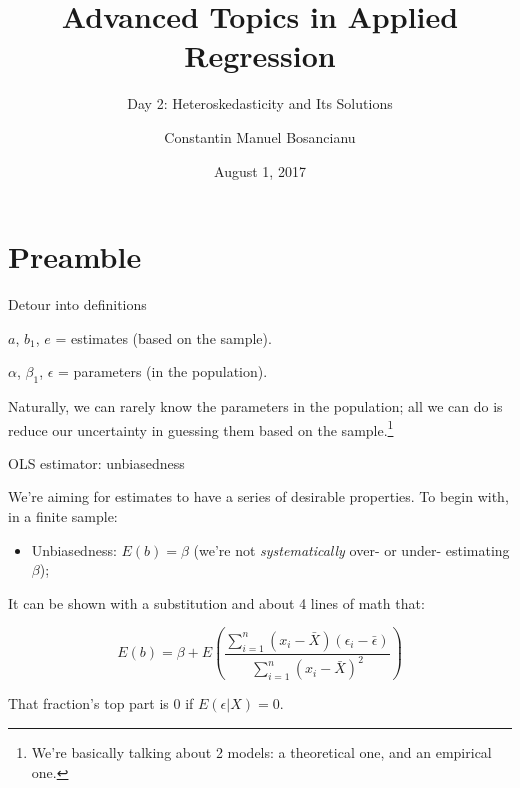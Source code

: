 \documentclass[12pt,english,pdf,xcolor=dvipsnames,aspectratio=169,handout]{beamer}\usepackage[]{graphicx}\usepackage[]{xcolor}
\title{Advanced Topics in Applied Regression}
\subtitle{Day 2: Heteroskedasticity and Its Solutions}
\author{Constantin Manuel Bosancianu}
\institute{Doctoral School of Political Science \\ Central European University, Budapest\\\href{mailto:bosancianu@icloud.com}{bosancianu@icloud.com}}
\date{August 1, 2017}
\begin{document}
\maketitle
\section{Preamble}



\begin{frame}{Detour into definitions}

$a$, $b_1$, $e$ = estimates (based on the sample).\bigskip

$\alpha$, $\beta_1$, $\epsilon$ = parameters (in the population).\bigskip

Naturally, we can rarely know the parameters in the population; all we can do is reduce our uncertainty in guessing them based on the sample.\footnote{We're basically talking about 2 models: a theoretical one, and an empirical one.}

\end{frame}



\begin{frame}{OLS estimator: unbiasedness}

We're aiming for estimates to have a series of desirable properties. To begin with, in a finite sample:

\begin{itemize}
  \item Unbiasedness: $E(b)=\beta$ (we're not \textit{systematically} over- or under- estimating $\beta$);
\end{itemize}\bigskip

It can be shown with a substitution and about 4 lines of math that:

\begin{equation}
E(b) = \beta + E\left(\frac{\sum_{i=1}^n(x_i-\bar{X})(\epsilon_i - \bar{\epsilon})}{\sum_{i=1}^n(x_i - \bar{X})^2}\right)
\end{equation}

That fraction's top part is 0 if $E(\epsilon | X) = 0$.

\end{frame}
\end{document}
